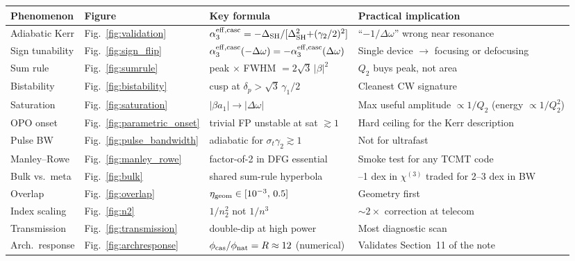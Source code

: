 \documentclass[11pt,a4paper]{article}
\newcommand{\chithree}{\chi^{(3)}}
\newcommand{\Dom}{\Delta\omega}
\newcommand{\DSH}{\Delta_{\rm SH}}
\newcommand{\effc}{{\rm eff,casc}}
\newcommand{\geom}{{\rm geom}}
\begin{document}
\begin{table}[H]
\centering
\renewcommand{\arraystretch}{1.20}
\setlength{\tabcolsep}{3pt}
\footnotesize
\begin{tabular}{>{\raggedright\arraybackslash}p{}
                >{\raggedright\arraybackslash}p{}
                >{\raggedright\arraybackslash}p{}
                >{\raggedright\arraybackslash}p{}}
\toprule
Phenomenon & Figure & Key formula & Practical implication \\
\midrule
Adiabatic Kerr & Fig.~\ref{fig:validation} &
$\alpha_3^{\effc} = -\DSH/[\DSH^{2}{+}(\gamma_2/2)^{2}]$ &
``$-1/\Dom$'' wrong near resonance \\
Sign tunability & Fig.~\ref{fig:sign_flip} &
$\alpha_3^{\effc}(-\Dom) = -\alpha_3^{\effc}(\Dom)$ &
Single device $\to$ focusing or defocusing \\
Sum rule & Fig.~\ref{fig:sumrule} &
peak $\times$ FWHM $= 2\sqrt{3}\,|\beta|^{2}$ &
$Q_2$ buys peak, not area \\
Bistability & Fig.~\ref{fig:bistability} &
cusp at $\delta_p > \sqrt{3}\, \gamma_1/2$ &
Cleanest CW signature \\
Saturation & Fig.~\ref{fig:saturation} &
$|\beta a_1| \to |\Dom|$ &
Max useful amplitude $\propto 1/Q_2$ (energy $\propto 1/Q_2^{2}$) \\
OPO onset & Fig.~\ref{fig:parametric_onset} &
trivial FP unstable at sat $\gtrsim 1$ &
Hard ceiling for the Kerr description \\
Pulse BW & Fig.~\ref{fig:pulse_bandwidth} &
adiabatic for $\sigma_t \gamma_2 \gtrsim 1$ &
Not for ultrafast \\
Manley--Rowe & Fig.~\ref{fig:manley_rowe} &
factor-of-2 in DFG essential &
Smoke test for any TCMT code \\
Bulk vs.~meta & Fig.~\ref{fig:bulk} &
shared sum-rule hyperbola &
0.5--1 dex in $\chithree$ traded for 2--3 dex in BW \\
Overlap & Fig.~\ref{fig:overlap} &
$\eta_\geom \in [10^{-3},\, 0.5]$ &
Geometry first \\
Index scaling & Fig.~\ref{fig:n2} &
$1/n_2^{2}$ not $1/n^{3}$ &
$\sim 2\times$ correction at telecom \\
Transmission & Fig.~\ref{fig:transmission} &
double-dip at high power &
Most diagnostic scan \\
\midrule
Arch.\ response & Fig.~\ref{fig:archresponse} &
$\phi_{\rm cas}/\phi_{\rm nat} = R \approx 12$ (numerical) &
Validates Section~11 of the note \\

\end{tabular}
\end{table}
\end{document}
